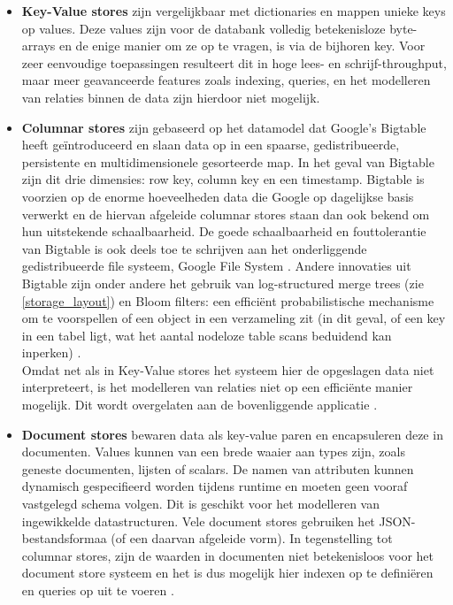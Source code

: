 \begin{itemize}
\item \textbf{Key-Value stores} zijn vergelijkbaar met dictionaries en mappen unieke keys op values. Deze values zijn voor de databank volledig betekenisloze byte-arrays en de enige manier om ze op te vragen, is via de bijhoren key. Voor zeer eenvoudige toepassingen resulteert dit in hoge lees- en schrijf-throughput, maar meer geavanceerde features zoals indexing, queries, en het modelleren van relaties binnen de data zijn hierdoor niet mogelijk\cite{hecht2011nosql}\cite{grolinger2013data}.

\item \textbf{Columnar stores}
\label{Bigtable} zijn gebaseerd op het datamodel dat Google's Bigtable heeft ge\"introduceerd en slaan data op in een spaarse, gedistribueerde, persistente en multidimensionele gesorteerde map\cite{chang2008bigtable}. In het geval van Bigtable zijn dit drie dimensies: row key, column key en een timestamp. Bigtable is voorzien op de enorme hoeveelheden data die Google op dagelijkse basis verwerkt en de hiervan afgeleide columnar stores staan dan ook bekend om hun uitstekende schaalbaarheid. De goede schaalbaarheid en fouttolerantie van Bigtable is ook deels toe te schrijven aan het onderliggende gedistribueerde file systeem, Google File System \cite{ghemawat2003google}. Andere innovaties uit Bigtable zijn onder andere het gebruik van log-structured merge trees (zie \ref{storage_layout}) en Bloom filters: een effici\"ent probabilistische mechanisme om te voorspellen of een object in een verzameling zit (in dit geval, of een key in een tabel ligt, wat het aantal nodeloze table scans beduidend kan inperken) \cite{mullin1983second}.\\
Omdat net als in Key-Value stores het systeem hier de opgeslagen data niet interpreteert, is het modelleren van relaties niet op een effici\"ente manier mogelijk. Dit wordt overgelaten aan de bovenliggende applicatie \cite{hecht2011nosql}.

\item \textbf{Document stores} bewaren data als key-value paren en encapsuleren deze in documenten. Values kunnen van een brede waaier aan types zijn, zoals geneste documenten, lijsten of scalars. De namen van attributen kunnen dynamisch gespecifieerd worden tijdens runtime en moeten geen vooraf vastgelegd schema volgen\cite{cattell2011scalable}. Dit is geschikt voor het modelleren van ingewikkelde datastructuren. Vele document stores gebruiken het JSON-bestandsformaa (of een daarvan afgeleide vorm). In tegenstelling tot columnar stores, zijn de waarden in documenten niet betekenisloos voor het document store systeem en het is dus mogelijk hier indexen op te defini\"eren en queries op uit te voeren \cite{hecht2011nosql}.


\end{itemize}

